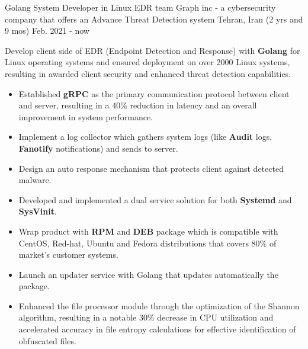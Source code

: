 

\begin{cventries}

  \cventry
    {Golang System Developer in Linux EDR team} %
    {Graph inc - \textnormal{a cybersecurity company that offers an Advance Threat Detection system}} %
    {Tehran, Iran} %
    {(2 yrs and 9 mos) Feb. 2021 - now} %
    {
      \begin{cvitems} %
        \item Develop client side of EDR (Endpoint Detection and Response) with \textbf{Golang} for Linux operating systems and ensured deployment on over 2000 Linux systems, resulting in awarded client security and enhanced threat detection capabilities.
        \begin{itemize}
            \item Established \textbf{gRPC} as the primary communication protocol between client and server, resulting in a 40\% reduction in latency and an overall improvement in system performance.
            \item Implement a log collector which gathers system logs (like \textbf{Audit} logs, \textbf{Fanotify} notifications) and sends to server. 
            \item Design an auto response mechanism that protects client against detected malware.
            \item Developed and implemented a dual service solution for both \textbf{Systemd} and \textbf{SysVinit}.
            \item Wrap product with \textbf{RPM} and \textbf{DEB} package which is compatible with CentOS, Red-hat, Ubuntu and Fedora distributions that covers 80\% of market’s customer systems.
            \item Launch an updater service with Golang that updates automatically the package.
            \item Enhanced the file processor module through the optimization of the Shannon algorithm, resulting in a notable 30\% decrease in CPU utilization and accelerated accuracy in file entropy calculations for effective identification of obfuscated files.

\end{itemize}
\end{cvitems}}
\end{cventries}
